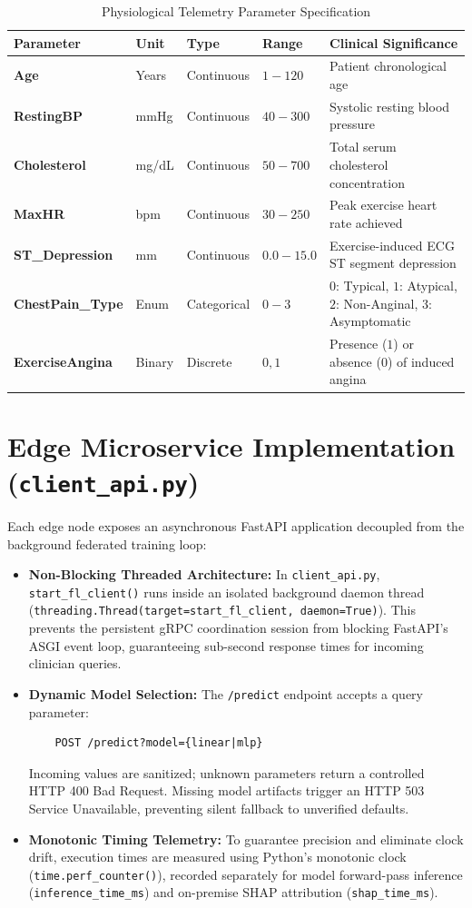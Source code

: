 \documentclass[12pt,a4paper,oneside]{report}
\begin{document}
\begin{table}[H]
\centering
\caption{Physiological Telemetry Parameter Specification}
\label{tab:telemetry_spec}
\begin{tabularx}{\textwidth}{l l l l X}
\toprule
\textbf{Parameter} & \textbf{Unit} & \textbf{Type} & \textbf{Range} & \textbf{Clinical Significance} \\
\midrule
\textbf{Age} & Years & Continuous & $1 - 120$ & Patient chronological age \\
\textbf{RestingBP} & mmHg & Continuous & $40 - 300$ & Systolic resting blood pressure \\
\textbf{Cholesterol} & mg/dL & Continuous & $50 - 700$ & Total serum cholesterol concentration \\
\textbf{MaxHR} & bpm & Continuous & $30 - 250$ & Peak exercise heart rate achieved \\
\textbf{ST\_Depression} & mm & Continuous & $0.0 - 15.0$ & Exercise-induced ECG ST segment depression \\
\textbf{ChestPain\_Type} & Enum & Categorical & $0 - 3$ & $0$: Typical, $1$: Atypical, $2$: Non-Anginal, $3$: Asymptomatic \\
\textbf{ExerciseAngina} & Binary & Discrete & $0, 1$ & Presence ($1$) or absence ($0$) of induced angina \\
\bottomrule
\end{tabularx}
\end{table}

\section{Edge Microservice Implementation (\texttt{client\_api.py})}
Each edge node exposes an asynchronous FastAPI application decoupled from the background federated training loop:

\begin{itemize}
    \item \textbf{Non-Blocking Threaded Architecture:} In \texttt{client\_api.py}, \texttt{start\_fl\_client()} runs inside an isolated background daemon thread (\texttt{threading.Thread(target=start\_fl\_client, daemon=True)}). This prevents the persistent gRPC coordination session from blocking FastAPI's ASGI event loop, guaranteeing sub-second response times for incoming clinician queries.
    \item \textbf{Dynamic Model Selection:} The \texttt{/predict} endpoint accepts a query parameter:
    \begin{verbatim}
    POST /predict?model={linear|mlp}
    \end{verbatim}
    Incoming values are sanitized; unknown parameters return a controlled HTTP 400 Bad Request. Missing model artifacts trigger an HTTP 503 Service Unavailable, preventing silent fallback to unverified defaults.
    \item \textbf{Monotonic Timing Telemetry:} To guarantee precision and eliminate clock drift, execution times are measured using Python's monotonic clock (\texttt{time.perf\_counter()}), recorded separately for model forward-pass inference (\texttt{inference\_time\_ms}) and on-premise SHAP attribution (\texttt{shap\_time\_ms}).
\end{itemize}
\end{document}
